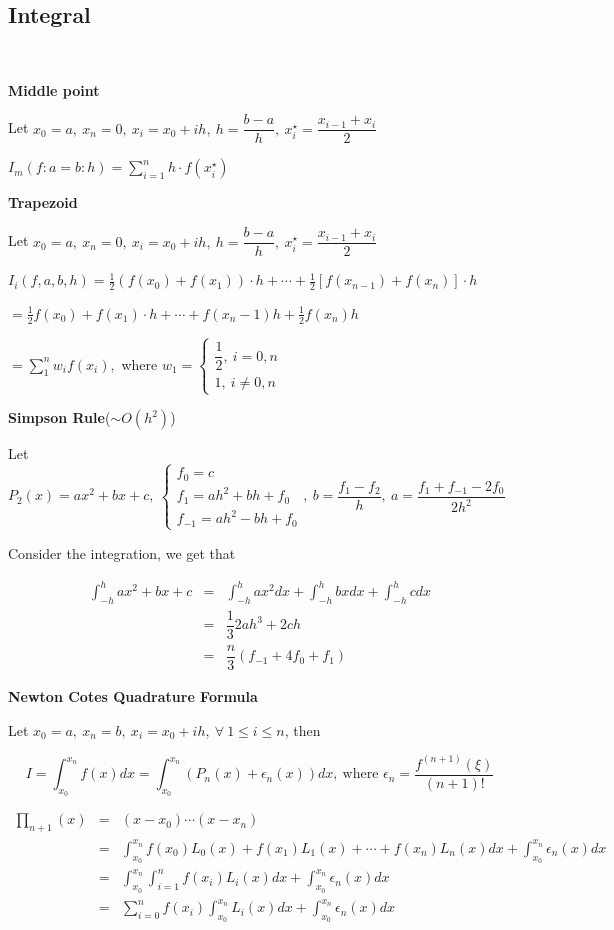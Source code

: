 \subsection{Integral}$ $

\textbf{Middle point}

Let $x_0 = a,~x_n = 0,~ x_i = x_0 + ih,~ h = \dfrac{b - a}{h},~x_i^{\star} = \dfrac{x_{i-1}+x_i}{2}$

$I_m(f:a=b:h) = \sum^{n}_{i=1}h\cdot f(x_i^{\star})$


\textbf{Trapezoid}

Let $x_0 = a,~x_n = 0,~ x_i = x_0 + ih,~ h = \dfrac{b - a}{h},~x_i^{\star} = \dfrac{x_{i-1}+x_i}{2}$

$I_i(f,a,b,h) = \frac{1}{2}(f(x_0)+f(x_1))\cdot h + \cdots + \frac{1}{2}[f(x_{n-1})+f(x_n)]\cdot h$

$ = \frac{1}{2}f(x_0)+f(x_1)\cdot h+\cdots + f(x_n - 1)h + \frac{1}{2}f(x_n)h$

$=\sum^n_1w_if(x_i),$ where $w_1 = \begin{cases}
	\dfrac{1}{2},~i=0,n\\1,~i\neq0,n
\end{cases}$

\textbf{Simpson Rule}($\sim O(h^2)$)

Let $P_2(x) = ax^2+bx+c,~\begin{cases}
	f_0 = c\\ f_1 = ah^2 + bh + f_0\\ f_{-1} = ah^2 - bh + f_0
\end{cases},~b = \dfrac{f_1 - f_2}{h},~ a = \dfrac{f_1+f_{-1}-2f_0}{2h^2}$

Consider the integration, we get that

\begin{eqnarray*}
	\int^h_{-h}ax^2+bx+c &=&\int^h_{-h}ax^2dx + \int^h_{-h}bxdx + \int^h_{-h}cdx\\
	&=&\dfrac{1}{3}2ah^3+2ch\\
	&=&\dfrac{n}{3}(f_{-1}+4f_0+f_1)
\end{eqnarray*}


\newpage

\textbf{Newton Cotes Quadrature Formula}

Let $x_0 = a,~x_n = b,~x_i = x_0 + ih,~\forall~ 1 \leq i \leq n$, then

$$I = \int^{x_n}_{x_0}f(x)dx = \int^{x_n}_{x_0}(P_n(x)+\epsilon_n(x))dx,~\text{where }\epsilon_n = \dfrac{f^{(n+1)}(\xi)}{(n+1)!}$$

\begin{eqnarray*}
	\prod_{n+1}(x) &=& (x - x_0)\cdots(x - x_n)\\
	&=& \int^{x_n}_{x_0}f(x_0)L_0(x)+f(x_1)L_1(x)+\cdots + f(x_n)L_n(x)dx+\int^{x_n}_{x_0}\epsilon_n(x)dx\\
	&=& \int^{x_n}_{x_0}\int^n_{i=1}f(x_i)L_i(x)dx + \int^{x_n}_{x_0}\epsilon_n(x)dx\\
	&=& \sum^n_{i=0}f(x_i)\int^{x_n}_{x_0}L_i(x)dx + \int^{x_n}_{x_0}\epsilon_n(x)dx
\end{eqnarray*}


